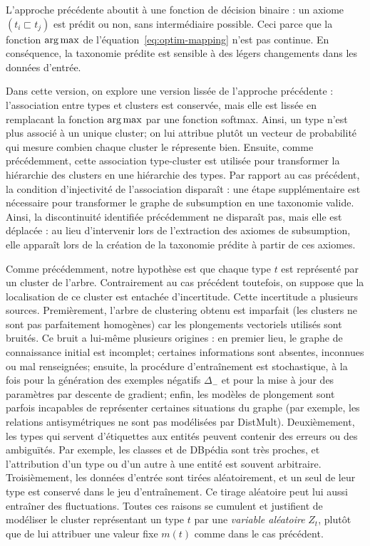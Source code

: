 L'approche précédente aboutit à une fonction de décision binaire : un axiome $(t_i \sqsubset t_j)$ est prédit ou non, sans intermédiaire possible. Ceci parce que la fonction $\operatorname*{arg\,max}$ de l'équation~\ref{eq:optim-mapping} n'est pas continue. En conséquence, la taxonomie prédite est sensible à des légers changements dans les données d'entrée.

Dans cette version, on explore une version lissée de l'approche précédente : l'association entre types et clusters est conservée, mais elle est lissée en remplacant la fonction $\operatorname*{arg\,max}$ par une fonction softmax. Ainsi, un type n'est plus associé à un unique cluster; on lui attribue plutôt un vecteur de probabilité qui mesure combien chaque cluster le répresente bien. Ensuite, comme précédemment, cette association type-cluster est utilisée pour transformer la hiérarchie des clusters en une hiérarchie des types. Par rapport au cas précédent, la condition d'injectivité de l'association disparaît : une étape supplémentaire est nécessaire pour transformer le graphe de subsumption en une taxonomie valide. Ainsi, la discontinuité identifiée précédemment ne disparaît pas, mais elle est déplacée : au lieu d'intervenir lors de l'extraction des axiomes de subsumption, elle apparaît lors de la création de la taxonomie prédite à partir de ces axiomes. 


Comme précédemment, notre hypothèse est que chaque type $t$ est représenté par un cluster de l'arbre. Contrairement au cas précédent toutefois, on suppose que la localisation de ce cluster est entachée d'incertitude. Cette incertitude a plusieurs sources. Premièrement, l'arbre de clustering obtenu est imparfait (les clusters ne sont pas parfaitement homogènes) car les plongements vectoriels utilisés sont bruités. Ce bruit a lui-même plusieurs origines : en premier lieu, le graphe de connaissance initial est incomplet; certaines informations sont absentes, inconnues ou mal renseignées; ensuite, la procédure d'entraînement est stochastique, à la fois pour la génération des exemples négatifs $\Delta_-$ et pour la mise à jour des paramètres par descente de gradient; enfin, les modèles de plongement sont parfois incapables de représenter certaines situations du graphe (par exemple, les relations antisymétriques ne sont pas modélisées par DistMult). Deuxièmement, les types qui servent d'étiquettes aux entités peuvent contenir des erreurs ou des ambiguïtés. Par exemple, les classes  et  de DBpédia sont très proches, et l'attribution d'un type ou d'un autre à une entité est souvent arbitraire. Troisièmement, les données d'entrée sont tirées aléatoirement, et un seul de leur type est conservé dans le jeu d'entraînement. Ce tirage aléatoire peut lui aussi entraîner des fluctuations. Toutes ces raisons se cumulent et justifient de modéliser le cluster représentant un type $t$ par une \textit{variable aléatoire} $Z_t$, plutôt que de lui attribuer une valeur fixe $m(t)$ comme dans le cas précédent.

